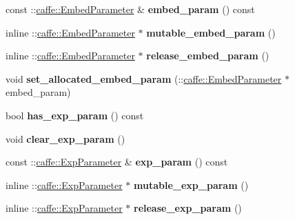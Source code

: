 \begin{DoxyCompactItemize}
const \+::\mbox{\hyperlink{classcaffe_1_1_embed_parameter}{caffe\+::\+Embed\+Parameter}} \& {\bfseries embed\+\_\+param} () const
\item 
\mbox{\label{classcaffe_1_1_layer_parameter_aa22e4c352e0e44f7d74c51566c4daf6a}} 
inline \+::\mbox{\hyperlink{classcaffe_1_1_embed_parameter}{caffe\+::\+Embed\+Parameter}} $\ast$ {\bfseries mutable\+\_\+embed\+\_\+param} ()
\item 
\mbox{\label{classcaffe_1_1_layer_parameter_a216c68b459b6a4e4f0cf39e3af95a91b}} 
inline \+::\mbox{\hyperlink{classcaffe_1_1_embed_parameter}{caffe\+::\+Embed\+Parameter}} $\ast$ {\bfseries release\+\_\+embed\+\_\+param} ()
\item 
\mbox{\label{classcaffe_1_1_layer_parameter_adde763d5346ea264b1aa5a944c4febe1}} 
void {\bfseries set\+\_\+allocated\+\_\+embed\+\_\+param} (\+::\mbox{\hyperlink{classcaffe_1_1_embed_parameter}{caffe\+::\+Embed\+Parameter}} $\ast$embed\+\_\+param)
\item 
\mbox{\label{classcaffe_1_1_layer_parameter_affda6f7b6bad5e5ff1986424f3d3f2dd}} 
bool {\bfseries has\+\_\+exp\+\_\+param} () const
\item 
\mbox{\label{classcaffe_1_1_layer_parameter_a185b31a05d3eeb8156944087539d2d36}} 
void {\bfseries clear\+\_\+exp\+\_\+param} ()
\item 
\mbox{\label{classcaffe_1_1_layer_parameter_ac450af6fea9ed69778f1f3b7376b2225}} 
const \+::\mbox{\hyperlink{classcaffe_1_1_exp_parameter}{caffe\+::\+Exp\+Parameter}} \& {\bfseries exp\+\_\+param} () const
\item 
\mbox{\label{classcaffe_1_1_layer_parameter_a287f093f9a81ba92fb617774de200d33}} 
inline \+::\mbox{\hyperlink{classcaffe_1_1_exp_parameter}{caffe\+::\+Exp\+Parameter}} $\ast$ {\bfseries mutable\+\_\+exp\+\_\+param} ()
\item 
\mbox{\label{classcaffe_1_1_layer_parameter_af07b3e8632c36e7116064d4283b4f849}} 
inline \+::\mbox{\hyperlink{classcaffe_1_1_exp_parameter}{caffe\+::\+Exp\+Parameter}} $\ast$ {\bfseries release\+\_\+exp\+\_\+param} ()

\end{DoxyCompactItemize}
